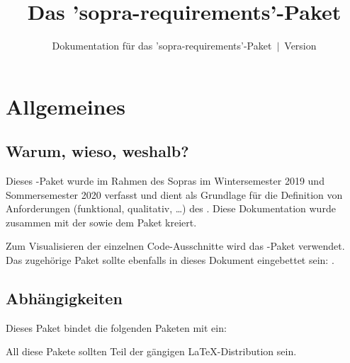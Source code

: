 \documentclass{sopra-base}
\title{Das 'sopra-requirements'-Paket}
\subtitle[Dokumentation für das 'sopra-requirements'-Paket]{Dokumentation für das 'sopra-requirements'-Paket~$\mid$~Version \thesorversion}
\begin{document}
    \maketitle%
%
%

%
%
%
%

\section{Allgemeines}
\subsection{Warum, wieso, weshalb?}
    Dieses \LaTeXe-Paket wurde im Rahmen des Sopras im 
    Wintersemester 2019 und Sommersemester 2020 verfasst und dient als
    Grundlage für die Definition von Anforderungen (funktional, qualitativ, \ldots)
    des . Diese Dokumentation wurde zusammen mit der 
     sowie dem Paket  kreiert.\par
    Zum Visualisieren der einzelnen Code-Ausschnitte wird das
    -Paket verwendet.
    Das zugehörige Paket sollte ebenfalls in dieses Dokument eingebettet sein: .
\subsection{Abhängigkeiten}
    Dieses Paket bindet die folgenden Paketen mit ein:
    \begin{multicols}{3}
    \end{multicols}
    All diese Pakete sollten Teil der gängigen \LaTeX-Distribution sein.
\end{document}
